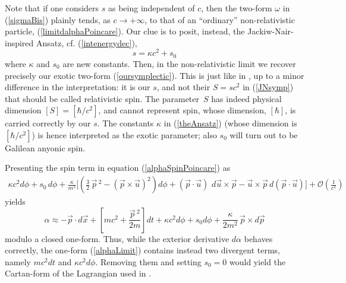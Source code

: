 \documentclass[a4paper,11pt]{article}
\newcommand{\vx}{{\vec x}}
\def\vp{{\vec p}}
\def\vx{{\vec x}}
\def\vu{{\vec u}}
\begin{document}

Note that if one
considers $s$ as being independent of $c$, then the two-form
$\omega$ in (\ref{sigmaBis}) plainly tends, as $c\to+\infty$, to that
of an ``ordinary'' non-relativistic particle, (\ref{limitdalphaPoincare}).
Our clue is to posit, instead, the Jackiw-Nair-inspired Ansatz, cf.
(\ref{intenergydec}),
\begin{equation}
s=
\kappa{}c^2+s_0
\label{theAnsatz}
\end{equation}
where  $\kappa$ and $s_0$ are new constants.
 Then, in the non-relativistic limit  we recover precisely our exotic two-form
(\ref{oursymplectic}). This is just like in
\cite{JaNa2}, up to a minor difference in the interpretation: it is our
$s$, and
not their $S=sc^2$ in (\ref{JNsymp})
that should be called relativistic spin.
The parameter~$S$  has indeed physical dimension
$[S]=[\hbar/c^2]$,
and cannot represent spin, whose dimension, $[\hbar]$, is carried
correctly by our $s$. The constants $\kappa$ in (\ref{theAnsatz})
(whose dimension is $[\hbar/c^2]$)
is hence interpreted as the exotic parameter; also
$s_0$ will turn out to be Galilean anyonic spin.


Presenting the spin term in equation (\ref{alphaSpinPoincare}) as
\begin{eqnarray}\label{limitofIdJ}
\kappa{}c^2d\phi
+
s_0\,d\phi
+
\frac{\kappa}{m^2}
\Bigg[
\left(
\frac{3}{2}\,\vp{\,}^2 - (\vp\times\vu)^2
\right)d\phi
+(\vp\cdot\vu)\,\,d\vu\times\vp
-
\vu\times\vp\,d(\vp\cdot\vu)
\Bigg]
+
\mathcal{O}\left(\frac{1}{c^2}\right)
\end{eqnarray}
yields
\begin{equation}
\alpha
\approx
-\vp\cdot d\vx
+\left[mc^2+\frac{\vp{\,}^2}{2m}\right]dt
+\kappa{}c^2d\phi
+s_0d\phi
+
\frac{\kappa}{2m^2}\,\vp\times{}d\vp
\label{alphaLimit}
\end{equation}
modulo a closed one-form. Thus, while
   the exterior derivative $d\alpha$  behaves correctly,
the one-form (\ref{alphaLimit}) contains instead
two divergent terms, namely $mc^2dt$ and
$\kappa{}c^2d\phi$. Removing them and setting $s_{0}=0$
would yield the Cartan-form of the Lagrangian used in \cite{DH}.
\end{document}
